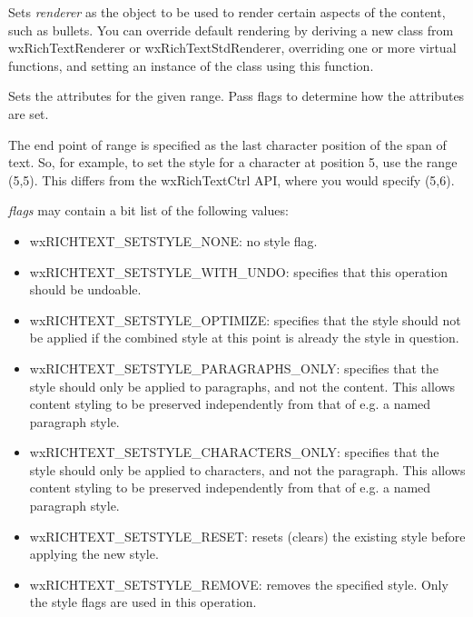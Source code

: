 Sets {\it renderer} as the object to be used to render certain aspects of the content, such as bullets.
You can override default rendering by deriving a new class from wxRichTextRenderer or wxRichTextStdRenderer,
overriding one or more virtual functions, and setting an instance of the class using this function.

\label{wxrichtextbuffersetstyle}



Sets the attributes for the given range. Pass flags to determine how the attributes are set.

The end point of range is specified as the last character position of the span of text.
So, for example, to set the style for a character at position 5, use the range (5,5).
This differs from the wxRichTextCtrl API, where you would specify (5,6).

{\it flags} may contain a bit list of the following values:

\begin{itemize}\itemsep=0pt
\item wxRICHTEXT\_SETSTYLE\_NONE: no style flag.
\item wxRICHTEXT\_SETSTYLE\_WITH\_UNDO: specifies that this operation should be undoable.
\item wxRICHTEXT\_SETSTYLE\_OPTIMIZE: specifies that the style should not be applied if the
combined style at this point is already the style in question.
\item wxRICHTEXT\_SETSTYLE\_PARAGRAPHS\_ONLY: specifies that the style should only be applied to paragraphs,
and not the content. This allows content styling to be preserved independently from that of e.g. a named paragraph style.
\item wxRICHTEXT\_SETSTYLE\_CHARACTERS\_ONLY: specifies that the style should only be applied to characters,
and not the paragraph. This allows content styling to be preserved independently from that of e.g. a named paragraph style.
\item wxRICHTEXT\_SETSTYLE\_RESET: resets (clears) the existing style before applying the new style.
\item wxRICHTEXT\_SETSTYLE\_REMOVE: removes the specified style. Only the style flags are used in this operation.
\end{itemize}

